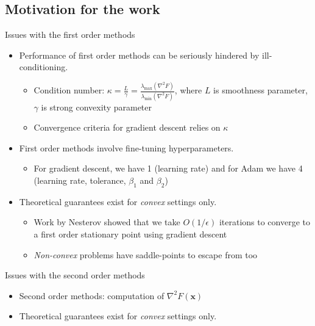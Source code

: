 \documentclass{beamer}
\newcommand{\h}{\nabla^{2}}
\newcommand{\xbold}{\mathbf{x}}
\begin{document}
\subsection{Motivation for the work}
\begin{frame}{Issues with the first order methods}
  \begin{itemize}
  \item<1->{
    Performance of first order methods can be seriously hindered by ill-conditioning.
    \begin{itemize}    
        \item<2->{Condition number: \(\kappa = \frac{L}{\gamma} = \frac{\lambda_{\max}(\h F)}{\lambda_{\min}(\h F)}\), where \(L\) is smoothness parameter, \(\gamma\) is strong convexity parameter}
        \item<3->{Convergence criteria for gradient descent relies on \(\kappa\)} %
    \end{itemize}
  }
  \item<4->{
    First order methods involve fine-tuning hyperparameters.
    \begin{itemize}    
        \item<5->{For gradient descent, we have 1 (learning rate) and for Adam we have 4 (learning rate, tolerance, \(\beta_{1}\) and \(\beta_{2}\))}
    \end{itemize}
  }
  \item<6->{
    Theoretical guarantees exist for \emph{convex} settings only.
    \begin{itemize}    
        \item<7->{Work by Nesterov showed that we take \(O(1/\epsilon)\) iterations to converge to a first order stationary point using gradient descent} %
        \item<8->{\emph{Non-convex} problems have saddle-points to escape from too}
    \end{itemize}
  }
  \end{itemize}
\end{frame}

\begin{frame}{Issues with the second order methods}
  \begin{itemize}
  \item<1-> {
    Second order methods: computation of \(\h F(\xbold)\)
    \begin{itemize}
    \end{itemize}
  }
  \item<4->{
    Theoretical guarantees exist for \emph{convex} settings only.
  } %
  \end{itemize}
\end{frame}
\end{document}
